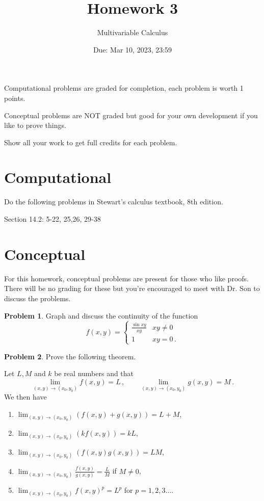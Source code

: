 \documentclass[12pt]{article}
\title{Homework 3}
\author{ Multivariable Calculus}
\date{Due: Mar 10, 2023, 23:59}
\theoremstyle{definition}
\newtheorem{problem}{Problem}
\begin{document}
\maketitle

Computational problems are graded for completion, each problem is worth 1 points.

Conceptual problems are NOT graded but good for your own development if you like to prove things.

Show all your work to get full credits for each problem.
\section{Computational}
Do the following problems in Stewart's calculus textbook, 8th edition.

Section 14.2: 5-22, 25,26, 29-38

\section{Conceptual}
For this homework, conceptual problems are present for those who like proofs.
There will be no grading for these but you're encouraged to meet with Dr. Son
to discuss the problems.

\begin{problem}
    Graph and discuss the continuity of the function
    \begin{equation*}
        f(x,y) = 
        \begin{cases}
            \frac{\sin xy}{xy} & xy\not=0 \\
            1 & xy= 0 \,.
        \end{cases}
    \end{equation*}
\end{problem}

\begin{problem}
    Prove the following theorem.



Let \(L,M\) and \(k\) be real numbers and that
\begin{equation*}
    \lim_{(x,y) \to (x_0,y_0)} f(x,y) = L \,, \qquad 
    \lim_{(x,y) \to (x_0,y_0)} g(x,y) = M \,.
\end{equation*}
We then have

\begin{enumerate}
\def\labelenumi{\arabic{enumi}.}
\item
  \(\displaystyle \lim_{(x,y) \to (x_0,y_0)} (f(x,y) + g(x,y)) = L + M\),
\item
  \(\displaystyle \lim_{(x,y) \to (x_0,y_0)} (k f(x,y)) = kL\),
\item
  \(\displaystyle \lim_{(x,y) \to (x_0,y_0)} (f(x,y) g(x,y)) = LM\),
\item
  \(\displaystyle \lim_{(x,y) \to (x_0,y_0)} \frac{f(x,y)}{g(x,y)} = \frac{L}{M}\) if \(M \not= 0\),
\item
  \(\displaystyle \lim_{(x,y) \to (x_0,y_0)} {f(x,y)^p} = L^p\) for \(p=1,2,3 \dots\).
\end{enumerate}

\end{problem}


%
\end{document}
